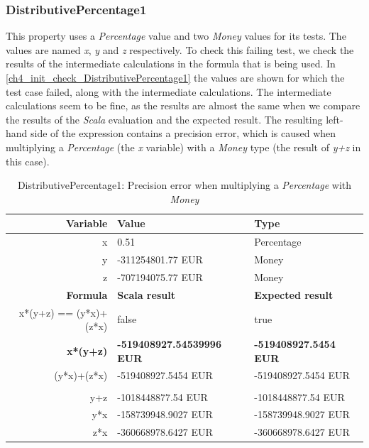 \subsubsection{DistributivePercentage1}
\label{ssct:ch5_distributivePercentage1}
This property uses a \textit{Percentage} value and two \textit{Money} values
for its tests. The values are named \textit{x}, \textit{y} and \textit{z}
respectively. To check this failing test, we check the results of the
intermediate calculations in the formula that is being used. In
\autoref{ch4_init_check_DistributivePercentage1} the values are shown for which
the test case failed, along with the intermediate calculations. The intermediate
calculations seem to be fine, as the results are almost the same when we compare
the results of the \textit{Scala} evaluation and the expected result. The
resulting left-hand side of the expression contains a precision error, which is
caused when multiplying a \textit{Percentage} (the \textit{x} variable) with a
\textit{Money} type (the result of \textit{y+z} in this case).
\FloatBarrier
\begin{table}[!ht]
\centering
\begin{tabular}{rll}
\hline
\textbf{Variable}      & \textbf{Value}                   & \textbf{Type}                \\ \hline
x                      & 0.51                             & Percentage                   \\
y                      & -311254801.77 EUR                & Money                        \\
z                      & -707194075.77 EUR                & Money                        \\ \hline
\textbf{Formula}       & \textbf{Scala result}            & \textbf{Expected result}     \\ \hline
x*(y+z) == (y*x)+(z*x) & false                            & true                         \\
\textbf{x*(y+z)}       & \textbf{-519408927.54539996 EUR} & \textbf{-519408927.5454 EUR} \\
(y*x)+(z*x)            & -519408927.5454 EUR              & -519408927.5454 EUR          \\
                       &                                  &                              \\
y+z                    & -1018448877.54 EUR               & -1018448877.54 EUR           \\
y*x                    & -158739948.9027 EUR              & -158739948.9027 EUR          \\
z*x                    & -360668978.6427 EUR              & -360668978.6427 EUR          \\ \hline
\end{tabular}
\caption{DistributivePercentage1: Precision error when multiplying a \textit{Percentage} with \textit{Money}}
\label{ch4_init_check_DistributivePercentage1}
\end{table}
\FloatBarrier

